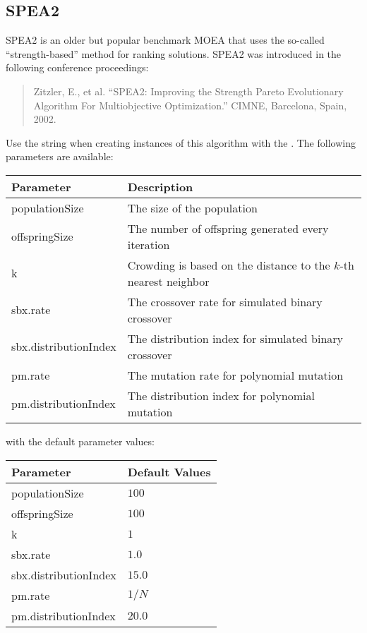 \subsection{SPEA2}
SPEA2 is an older but popular benchmark MOEA that uses the so-called ``strength-based'' method for ranking solutions.  SPEA2 was introduced in the following conference proceedings:
\begin{quote}
Zitzler, E., et al.  ``SPEA2: Improving the Strength Pareto Evolutionary Algorithm For Multiobjective Optimization.'' CIMNE, Barcelona, Spain, 2002.
\end{quote}
Use the string  when creating instances of this algorithm with the .  The following parameters are available:
\newline
\newline
\begin{tabularx}{\linewidth}{lX}
  \hline
  Parameter & Description \\
  \hline
  populationSize & The size of the population \\
  offspringSize & The number of offspring generated every iteration \\
  k & Crowding is based on the distance to the $k$-th nearest neighbor \\
  sbx.rate & The crossover rate for simulated binary crossover \\
  sbx.distributionIndex & The distribution index for simulated binary crossover \\
  pm.rate & The mutation rate for polynomial mutation \\
  pm.distributionIndex & The distribution index for polynomial mutation \\
  \hline
\end{tabularx}
\newline
\newline
with the default parameter values:
\newline
\newline
\begin{tabularx}{\linewidth}{lX}
  \hline
  Parameter & Default Values \\
  \hline
  populationSize & $100$ \\
  offspringSize & $100$ \\
  k & $1$ \\
  sbx.rate & $1.0$ \\
  sbx.distributionIndex & $15.0$ \\
  pm.rate & $1/N$ \\
  pm.distributionIndex & $20.0$ \\
  \hline
\end{tabularx}


